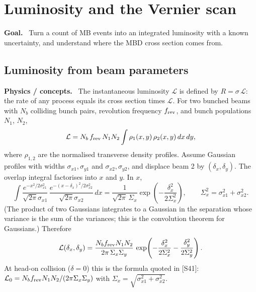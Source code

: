 \documentclass[11pt,letterpaper]{article}
\newcommand{\hd}[1]{\par\smallskip\noindent\textbf{\color{blue!50!black}#1.}\ }
\begin{document}
\section{Luminosity and the Vernier scan}
\hd{Goal} Turn a count of MB events into an integrated luminosity with a known uncertainty, and understand where the MBD cross section
comes from.

\subsection{Luminosity from beam parameters}
\hd{Physics / concepts} The instantaneous luminosity $\mathcal{L}$ is defined by $R = \sigma\,\mathcal{L}$: the rate of any process
equals its cross section times $\mathcal{L}$. For two bunched beams with $N_b$ colliding bunch pairs, revolution frequency $f_{\rm rev}$,
and bunch populations $N_1$, $N_2$,
\begin{equation}
\mathcal{L} = N_b\,f_{\rm rev}\,N_1 N_2 \int \rho_1(x,y)\,\rho_2(x,y)\,dx\,dy ,
\end{equation}
where $\rho_{1,2}$ are the normalised transverse density profiles. Assume Gaussian profiles with widths $\sigma_{x1},\sigma_{y1}$ and
$\sigma_{x2},\sigma_{y2}$, and displace beam 2 by $(\delta_x,\delta_y)$. The overlap integral factorises into $x$ and $y$. In $x$,
\begin{equation}
\int \frac{e^{-x^2/2\sigma_{x1}^2}}{\sqrt{2\pi}\sigma_{x1}}\,\frac{e^{-(x-\delta_x)^2/2\sigma_{x2}^2}}{\sqrt{2\pi}\sigma_{x2}}\,dx
= \frac{1}{\sqrt{2\pi}\,\Sigma_x}\exp\!\left(-\frac{\delta_x^2}{2\Sigma_x^2}\right),\qquad \Sigma_x^2=\sigma_{x1}^2+\sigma_{x2}^2 .
\end{equation}
(The product of two Gaussians integrates to a Gaussian in the separation whose variance is the sum of the variances; this is the
convolution theorem for Gaussians.) Therefore
\begin{equation}
\mathcal{L}(\delta_x,\delta_y) = \frac{N_b f_{\rm rev} N_1 N_2}{2\pi\,\Sigma_x\Sigma_y}\,
\exp\!\left(-\frac{\delta_x^2}{2\Sigma_x^2}-\frac{\delta_y^2}{2\Sigma_y^2}\right).
\label{eq:vernier}
\end{equation}
At head-on collision ($\delta=0$) this is the formula quoted in [S41]:
$\mathcal{L}_0 = N_b f_{\rm rev} N_1N_2/(2\pi\Sigma_x\Sigma_y)$ with $\Sigma_{x}=\sqrt{\sigma_{x1}^2+\sigma_{x2}^2}$.
\end{document}
